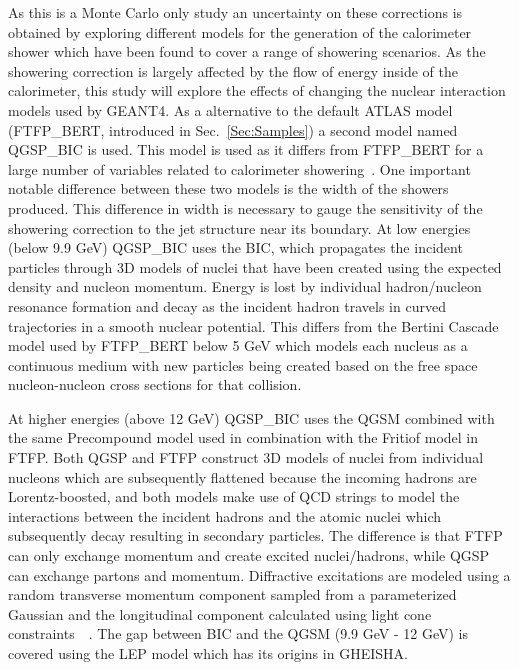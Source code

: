 As this is a Monte Carlo only study an uncertainty on these corrections is obtained by exploring different models for the generation of the calorimeter shower which have been found to cover a range of showering scenarios.  
As the showering correction is largely affected by the flow of energy inside of the calorimeter, this study will explore the effects of changing the nuclear interaction models used by GEANT4.  
As a alternative to the default ATLAS model (FTFP\_BERT, introduced in Sec.~\ref{Sec:Samples}) a second model named QGSP\_BIC is used.  
This model is used as it differs from FTFP\_BERT for a large number of variables related to calorimeter showering~\cite{Zhang:2253040}.  
One important notable difference between these two models is the width of the showers produced.  
This difference in width is necessary to gauge the sensitivity of the showering correction to the jet structure near its boundary.  
At low energies (below 9.9 GeV) QGSP\_BIC uses the \gls{BIC}, which propagates the incident particles through 3D models of nuclei that have been created using the expected density and nucleon momentum.  
Energy is lost by individual hadron/nucleon resonance formation and decay as the incident hadron travels in curved trajectories in a smooth nuclear potential.  
This differs from the Bertini Cascade model used by FTFP\_BERT below 5 GeV which models each nucleus as a continuous medium with new particles being created based on the free space nucleon-nucleon cross sections for that collision.  

At higher energies (above 12 GeV) QGSP\_BIC uses the \gls{QGSM} combined with the same Precompound model used in combination with the Fritiof model in FTFP.  
Both QGSP and FTFP construct 3D models of nuclei from individual nucleons which are subsequently flattened because the incoming hadrons are Lorentz-boosted, and both models make use of QCD strings to model the interactions between the incident hadrons and the atomic nuclei which subsequently decay resulting in secondary particles.  
The difference is that FTFP can only exchange momentum and create excited nuclei/hadrons, while QGSP can exchange partons and momentum.  
Diffractive excitations are modeled using a random transverse momentum component sampled from a parameterized Gaussian and the longitudinal component calculated using light cone constraints~\cite{GEANT4}~\cite{GEANT4Man}.   
The gap between BIC and the QGSM (9.9 GeV - 12 GeV) is covered using the \gls{LEP} model which has its origins in {\sc GHEISHA}\cite{Fesefeldt:1985yw}.  

